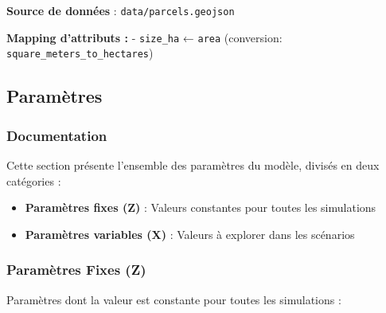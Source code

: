 \documentclass[
]{article}
\providecommand{\tightlist}{%
  \setlength{\itemsep}{0pt}\setlength{\parskip}{0pt}}
\begin{document}
\textbf{Source de données} : \texttt{data/parcels.geojson}

\textbf{Mapping d'attributs :} - \texttt{size\_ha} ← \texttt{area}
(conversion: \texttt{square\_meters\_to\_hectares})

\subsection{Paramètres}\label{paramuxe8tres}

\subsubsection{Documentation}\label{documentation-20}

Cette section présente l'ensemble des paramètres du modèle, divisés en
deux catégories :

\begin{itemize}
\tightlist
\item
  \textbf{Paramètres fixes (Z)} : Valeurs constantes pour toutes les
  simulations
\item
  \textbf{Paramètres variables (X)} : Valeurs à explorer dans les
  scénarios
\end{itemize}

\subsubsection{Paramètres Fixes (Z)}\label{paramuxe8tres-fixes-z}

Paramètres dont la valeur est constante pour toutes les simulations :
\end{document}

